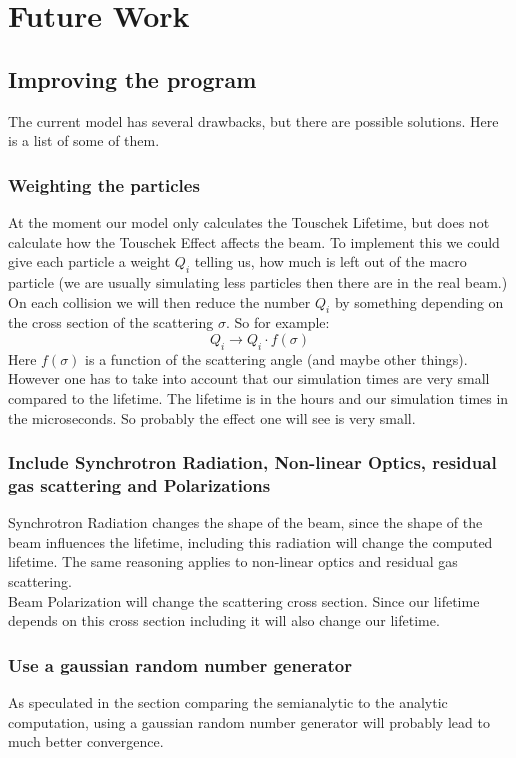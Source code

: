 \section{Future Work}
\subsection{Improving the program}
The current model has several drawbacks, but there are possible solutions. Here is a list of some of them.
\subsubsection{Weighting the particles}
At the moment our model only calculates the Touschek Lifetime, but does not calculate how the Touschek Effect affects the beam. To implement this we could give each particle a weight $Q_i$ telling us, how much is left out of the macro particle (we are usually simulating less particles then there are in the real beam.) On each collision we will then reduce the number $Q_i$ by something depending on the cross section of the scattering $\sigma$. So for example:
\begin{equation} Q_i \rightarrow Q_i \cdot f(\sigma) \end{equation}
Here $f(\sigma)$ is a function of the scattering angle (and maybe other things). However one has to take into account that our simulation times are very small compared to the lifetime. The lifetime is in the hours and our simulation times in the microseconds. So probably the effect one will see is very small.
\subsubsection{Include Synchrotron Radiation, Non-linear Optics, residual gas scattering and Polarizations}
Synchrotron Radiation changes the shape of the beam, since the shape of the beam influences the lifetime, including this radiation will change the computed lifetime. The same reasoning applies to non-linear optics and residual gas scattering.\\
Beam Polarization will change the scattering cross section. Since our lifetime depends on this cross section including it will also change our lifetime.
\subsubsection{Use a gaussian random number generator}
As speculated in the section comparing the semianalytic to the analytic computation, using a gaussian random number generator will probably lead to much better convergence.
